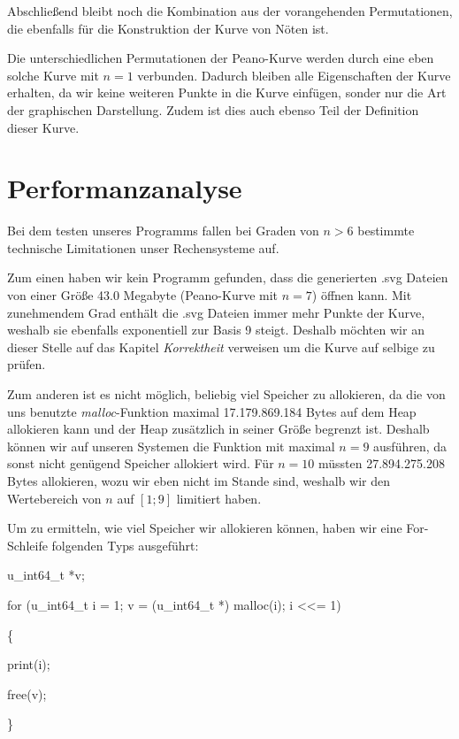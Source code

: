 \documentclass[course=asp]{aspdoc}
\begin{document}
Abschließend bleibt noch die Kombination aus der vorangehenden Permutationen, die ebenfalls für die Konstruktion der Kurve von Nöten ist. 


Die unterschiedlichen Permutationen der Peano-Kurve werden durch eine eben solche Kurve mit $n = 1$ verbunden. Dadurch bleiben alle Eigenschaften der Kurve erhalten, da wir keine weiteren Punkte in die Kurve einfügen, sonder nur die Art der graphischen Darstellung. Zudem ist dies auch ebenso Teil der Definition dieser Kurve. 


\newpage
\section{Performanzanalyse}

Bei dem testen unseres Programms fallen bei Graden von $n > 6$ bestimmte technische Limitationen unser Rechensysteme auf. 

Zum einen haben wir kein Programm gefunden, dass die generierten .svg Dateien von einer Größe 43.0 Megabyte (Peano-Kurve mit $n = 7$) öffnen kann. Mit zunehmendem Grad enthält die .svg Dateien immer mehr Punkte der Kurve, weshalb sie ebenfalls exponentiell zur Basis 9 steigt. Deshalb möchten wir an dieser Stelle auf das Kapitel \textit{Korrektheit} verweisen um die Kurve auf selbige zu prüfen.

Zum anderen ist es nicht möglich, beliebig viel Speicher zu allokieren, da die von uns benutzte \textit{malloc}-Funktion maximal 17.179.869.184 Bytes auf dem Heap allokieren kann und der Heap zusätzlich in seiner Größe begrenzt ist. Deshalb können wir auf unseren Systemen die Funktion mit maximal $n = 9$ ausführen, da sonst nicht genügend Speicher allokiert wird. Für $n = 10$ müssten 27.894.275.208 Bytes allokieren, wozu wir eben nicht im Stande sind, weshalb wir den Wertebereich von $n$ auf $[1;9]$ limitiert haben.

Um zu ermitteln, wie viel Speicher wir allokieren können, haben wir eine For-Schleife  folgenden Typs ausgeführt:

\begin{PseudoCode} %
u\_int64\_t *v;    	


for (u\_int64\_t i = 1; v = (u\_int64\_t *) malloc(i); i <<= 1)   

  
\{     

    
print(i);  
	
	      
free(v);    
	
	 
\}
\end{PseudoCode}
\end{document}
